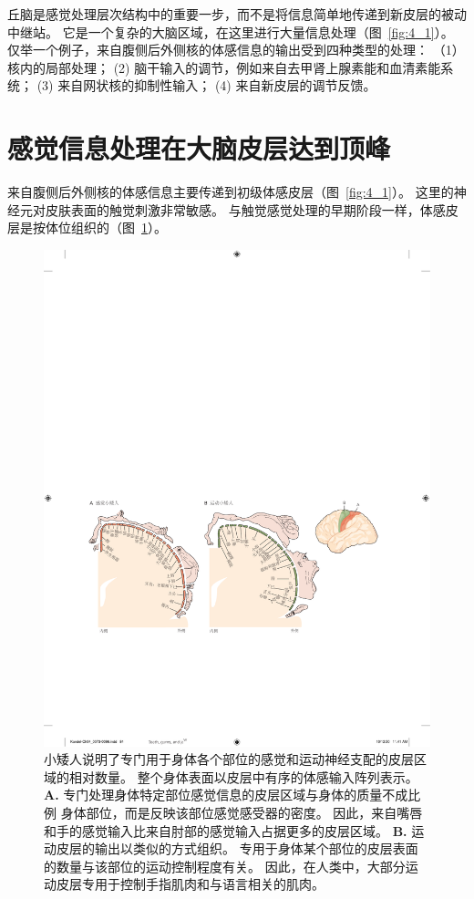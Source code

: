 丘脑是感觉处理层次结构中的重要一步，而不是将信息简单地传递到新皮层的被动中继站。 
它是一个复杂的大脑区域，在这里进行大量信息处理（图~\ref{fig:4_1}）。 
仅举一个例子，来自腹侧后外侧核的体感信息的输出受到四种类型的处理：
（1）核内的局部处理；
(2) 脑干输入的调节，例如来自去甲肾上腺素能和血清素能系统； 
(3) 来自网状核的抑制性输入； 
(4) 来自新皮层的调节反馈。


\section{感觉信息处理在大脑皮层达到顶峰}

来自腹侧后外侧核的体感信息主要传递到初级体感皮层（图~\ref{fig:4_1}）。 
这里的神经元对皮肤表面的触觉刺激非常敏感。 
与触觉感觉处理的早期阶段一样，体感皮层是按体位组织的（图~\ref{fig:4_8}）。


\begin{figure}[htbp]
	\centering
	\includegraphics[width=1.0\linewidth]{chap04/fig_4_8}
	\caption{小矮人说明了专门用于身体各个部位的感觉和运动神经支配的皮层区域的相对数量。
		整个身体表面以皮层中有序的体感输入阵列表示。
		\textbf{A.} 专门处理身体特定部位感觉信息的皮层区域与身体的质量不成比例 身体部位，而是反映该部位感觉感受器的密度。
		因此，来自嘴唇和手的感觉输入比来自肘部的感觉输入占据更多的皮层区域。
		\textbf{B.} 运动皮层的输出以类似的方式组织。
		专用于身体某个部位的皮层表面的数量与该部位的运动控制程度有关。
		因此，在人类中，大部分运动皮层专用于控制手指肌肉和与语言相关的肌肉。}
	\label{fig:4_8}
\end{figure}


